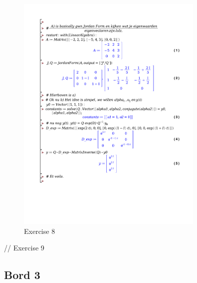 \documentclass[a4paper]{report}
\begin{document}
\begin{figure}[H]
	\centering
	\includegraphics[width=0.8\textwidth]{exercises/huis_3_ex_8.pdf}
	\caption{Exercise 8}
	\label{fig:huis_3_ex_8}
\end{figure}

// Exercise 9


\subsection*{Bord 3}
\end{document}

